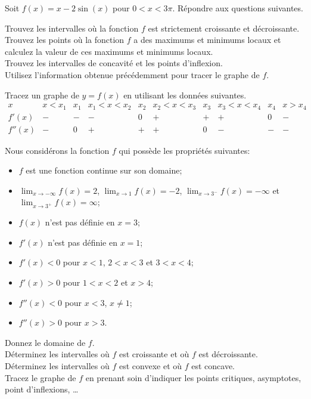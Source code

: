 \begin{question}[\life \eng]
Soit $\displaystyle f(x) = x - 2\sin(x)$ pour $0<x<3\pi$. Répondre aux
questions suivantes.

 Trouvez les intervalles où la fonction $f$ est strictement
croissante et décroissante.\\
 Trouvez les points où la fonction $f$ a des maximums et
minimums locaux et calculez la valeur de ces maximums et minimums
locaux.\\
 Trouvez les intervalles de concavité et les points
d'inflexion.\\
 Utilisez l'information obtenue précédemment pour tracer le
graphe de $f$.
\label{6Q18}
\end{question}

\begin{question}
Tracez un graphe de $y = f(x)$ en utilisant les données suivantes.
\[
\begin{array}{c|c|c|c|c|c|c|c|c|c}
x & x<x_1 & x_1 & x_1<x<x_2 & x_2 & x_2<x<x_3 & x_3 & x_3<x<x_4 &
x_4 & x>x_4 \\
\hline
f'(x) & - & - & - & 0 & + & + & + & 0 & - \\
f''(x) & - & 0 & + & + & + & 0 & - & - & -
\end{array}
\]
\label{6Q19}
\end{question}

\begin{question}[4 points]
Nous considérons la fonction $f$ qui possède les propriétés suivantes:
{\renewcommand{\labelitemi}{\textbullet}
\begin{itemize}
\item $f$ est une fonction continue sur son domaine;
\item $\displaystyle \lim_{x\to -\infty}f(x)=2$,
$\displaystyle \lim_{x\to 1}f(x)=-2$,
$\displaystyle \lim_{x\to 3^-} f(x) = -\infty$ et
$\displaystyle \lim_{x\to 3^+}f(x)= \infty$;
\item $f(x)$ n'est pas définie en $x=3$;
\item $f'(x)$ n'est pas définie en $x=1$;
\item $f'(x)<0$ pour $x<1$, $2 < x < 3$ et $3 < x < 4$;
\item $f'(x)>0$ pour $1 < x < 2$ et $x > 4$;
\item $f''(x)<0$ pour $x<3$, $x\neq 1$;
\item $f''(x)>0$ pour $x>3$.
\end{itemize}
}
 Donnez le domaine de $f$.\\
 Déterminez les intervalles où $f$ est croissante et où $f$
est décroissante.\\
 Déterminez les intervalles où $f$ est convexe et
où $f$ est concave.\\
 Tracez le graphe de $f$ en prenant soin d'indiquer les points
critiques, asymptotes, point d'inflexions, \ldots
\label{6Q20}
\end{question}

